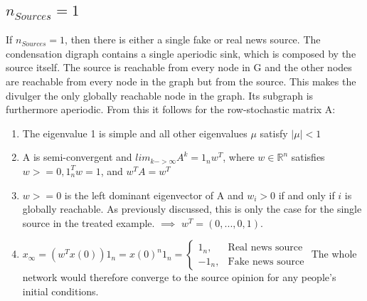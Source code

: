 \subsection{$n_{Sources} = 1$}
If $n_{Sources}=1$, then there is either a single fake or real news source. The condensation digraph contains a single aperiodic sink, which is composed by the source itself. The source is reachable from every node in G and the other nodes are reachable from every node in the graph but from the source. This makes the divulger the only globally reachable node in the graph. Its subgraph is furthermore aperiodic. From this it follows for the row-stochastic matrix A:
\begin{enumerate}
	\item
	The eigenvalue 1 is simple and all other eigenvalues $\mu$ satisfy $|\mu|<1$
	\item
	A is semi-convergent and $lim_{k->\infty} A^k = 1_n w^T$, where $w \in \mathbb{R}^n$ satisfies $w>=0, 1_n^T w = 1$, and $w^TA=w^T$
	\item
	$w>=0$ is the left dominant eigenvector of A and $w_i>0$ if and only if $i$ is globally reachable. As previously discussed, this is only the case for the single source in the treated example. \newline
	$\implies$ $w^T = (0,...,0,1)$.
	\item
	$x_\infty = (w^T x(0))1_n = x(0)^n 1_n = 	\begin{cases}
	1_n,& \text{Real news source}\\
	-1_n, & \text{Fake news source}
	\end{cases}$
	\newline The whole network would therefore converge to the source opinion for any people's initial conditions.
\end{enumerate}